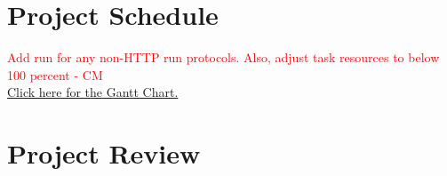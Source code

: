 \documentclass{article}
\begin{document}
\section{Project Schedule}
\textcolor{red}{Add run for any non-HTTP run protocols. Also, adjust task resources to below 100 percent  - CM} \\
\href{run:../../ProjectSchedule/ProjectSchedule.gan}{Click here for the Gantt Chart.}

\section{Project Review}
\end{document}
